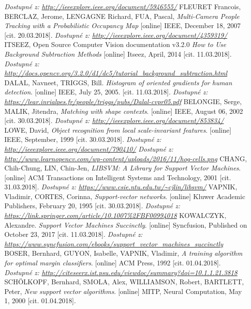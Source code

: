 \begin{thebibliography}{99}
 		\textit{Dostupné z: \url{http://ieeexplore.ieee.org/document/5946555/}}
 	 FLEURET Francois, BERCLAZ, Jerome, LENGAGNE Richard, FUA, Pascal, \textit{Multi-Camera People Tracking with a Probabilistic Occupancy Map} [online] IEEE, December 18, 2007  [cit. 20.03.2018]. 
 		\textit{Dostupné z: \url{http://ieeexplore.ieee.org/document/4359319/}}
	ITSEEZ, Open Source Computer Vision documentation v3.2.0 \textit{How to Use Background Subtraction Methods} [online] Itseez, April, 2014 [cit. 11.03.2018].
		\textit{Dostupné z: \url{http://docs.opencv.org/3.2.0/d1/dc5/tutorial_background_subtraction.html}}
	 {DALAL, Navneet, TRIGGS, Bill. \textit{Histogram of oriented gradients for human detection}. [online] IEEE, July 25, 2005. [cit. 11.03.2018].
		\textit{Dostupné z: \url{https://lear.inrialpes.fr/people/triggs/pubs/Dalal-cvpr05.pdf}}}
	 BELONGIE, Serge, MALIK, Jitendra, \textit{Matching with shape contexts}. [online] IEEE, August 06, 2002 [cit. 30.03.2018]. 
 		\textit{Dostupné z: \url{http://ieeexplore.ieee.org/document/853834/}}
 	 LOWE, David, \textit{Object recognition from local scale-invariant features}. [online] IEEE, September, 1999 [cit. 30.03.2018]. 
 		\textit{Dostupné z: \url{http://ieeexplore.ieee.org/document/790410/}}
	 \textit{Dostupné z: \url{http://www.learnopencv.com/wp-content/uploads/2016/11/hog-cells.png}}
	 CHANG, Chih-Chung, LIN, Chin-Jen, \textit{LIBSVM: A Library for Support Vector Machines}. [online] ACM Transactions on Intelligent Systems and Technology, 2001 [cit. 31.03.2018]. 
 		\textit{Dostupné z: \url{https://www.csie.ntu.edu.tw/~cjlin/libsvm/}}
	 VAPNIK, Vladimir, CORTES, Corinna, \textit{Support-vector networks}. [online] Kluwer Academic Publishers, February 20, 1995 [cit. 30.03.2018]. 
 		\textit{Dostupné z: \url{https://link.springer.com/article/10.1007\%2FBF00994018}}
	 KOWALCZYK, Alexandre.  \textit{Support Vector Machines Succinctly}.  [online] Syncfusion, Published on October 23, 2017 [cit. 11.03.2018]. 
		\textit{Dostupné z: \url{https://www.syncfusion.com/ebooks/support_vector_machines_succinctly}}
	 BOSER, Bernhard, GUYON, Isabelle, VAPNIK, Vladimir, \textit{A training algorithm for optimal margin classifiers}. [online] ACM Press, 1992 [cit. 01.04.2018]. 
 		\textit{Dostupné z: \url{http://citeseerx.ist.psu.edu/viewdoc/summary?doi=10.1.1.21.3818}}
 	 SCHÖLKOPF, Bernhard, SMOLA, Alex, WILLIAMSON, Robert, BARTLETT, Peter, \textit{New support vector algorithms}. [online] MITP, Neural Computation, May 1, 2000 [cit. 01.04.2018]. 

\end{thebibliography}
